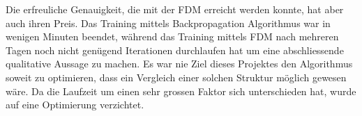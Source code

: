 Die erfreuliche Genauigkeit, die mit der FDM erreicht werden konnte,
hat aber auch ihren Preis.
Das Training mittels Backpropagation Algorithmus war in wenigen
Minuten beendet, während das Training mittels FDM nach mehreren
Tagen noch nicht genügend Iterationen durchlaufen hat um eine
abschliessende qualitative Aussage zu machen.
Es war nie Ziel dieses Projektes den Algorithmus soweit zu optimieren,
dass ein Vergleich einer solchen Struktur möglich gewesen wäre.
Da die Laufzeit um einen sehr grossen Faktor sich unterschieden
hat, wurde auf eine Optimierung verzichtet.
